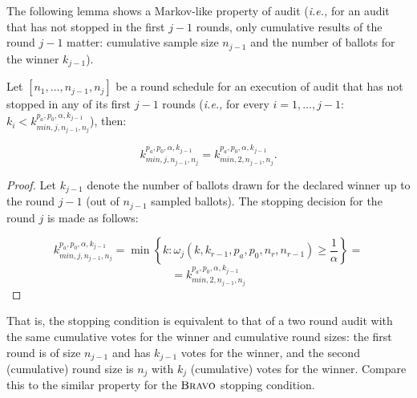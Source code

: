 The following lemma shows a Markov-like property of \Providence audit (\textit{i.e.,}
for an audit that has not stopped in the first $j-1$ rounds, only cumulative results of the round $j-1$ matter: cumulative sample size $n_{j-1}$ and the number of ballots for the winner $k_{j-1}$).

\begin{lemma}\label{lemma:markov}
Let $[n_1, \ldots, n_{j-1}, n_j]$ be a round schedule for an execution of  \Providence audit that has not stopped
in any of its first $j-1$ rounds (\textit{i.e.,} for every $i = 1, \ldots, j-1$:
$k_i < k^{p_a, p_0, \alpha, k_{j-1}}_{min, j, n_{j-1}, n_j} $), then: 

\[ 
k^{p_a, p_0, \alpha, k_{j-1}}_{min, j, n_{j-1}, n_j} = k^{p_a, p_0, \alpha, k_{j-1}}_{min, 2, n_{j-1}, n_j} .
\]
\end{lemma}
\begin{proof}
Let $k_{j-1}$ denote the number of ballots drawn for the declared winner up to the round $j-1$ (out of $n_{j-1}$ sampled ballots). The stopping decision for the round $j$ is made as follows:

\[
 k^{p_a, p_0, \alpha, k_{j-1}}_{min, j, n_{j-1}, n_j}  = \min\left\{k : \omega_{j}(k, k_{r-1}, p_a, p_0, n_r, n_{r-1}) \geq \frac{1}{\alpha}  \right\} = 
\]
\[
  =  k^{p_a, p_0, \alpha, k_{j-1}}_{min, 2, n_{j-1}, n_j}  
\]

\end{proof}

That is, the stopping condition is equivalent to that of a two round audit with the same cumulative votes for the winner and cumulative round sizes: the first round is of size $n_{j-1}$ and has $k_{j-1}$ votes for the winner, and the second (cumulative) round size is $n_j$ with $k_j$ (cumulative) votes for the winner. Compare this to the similar property for the $\textsc{Bravo}$ stopping condition. 


